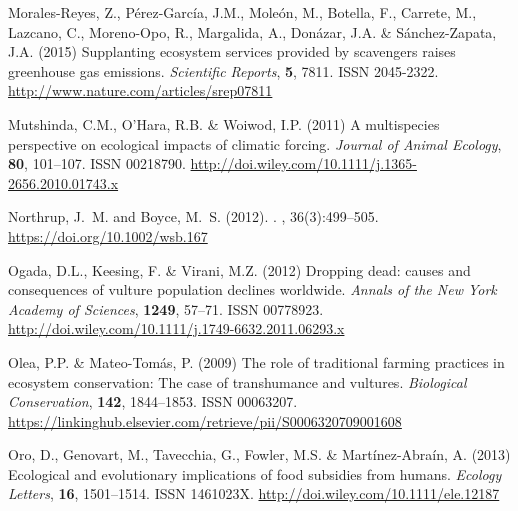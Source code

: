 \documentclass[12pt]{article}
\begin{document}
\begin{thebibliography}{87}
	Morales-Reyes, Z., P{\'{e}}rez-Garc{\'{i}}a, J.M., Mole{\'{o}}n, M., Botella,
	F., Carrete, M., Lazcano, C., Moreno-Opo, R., Margalida, A., Don{\'{a}}zar,
	J.A. \& S{\'{a}}nchez-Zapata, J.A. (2015) {Supplanting ecosystem services
		provided by scavengers raises greenhouse gas emissions}.
	\newblock \emph{Scientific Reports}, \textbf{5}, 7811.
	\newblock ISSN 2045-2322.
	\newline\urlprefix\url{http://www.nature.com/articles/srep07811}
	
	Mutshinda, C.M., O'Hara, R.B. \& Woiwod, I.P. (2011) {A multispecies
		perspective on ecological impacts of climatic forcing}.
	\newblock \emph{Journal of Animal Ecology}, \textbf{80}, 101--107.
	\newblock ISSN 00218790.
	\newline\urlprefix\url{http://doi.wiley.com/10.1111/j.1365-2656.2010.01743.x}
	
	Northrup, J.~M. and Boyce, M.~S. (2012).
	.
	, 36(3):499--505.
	\newline\urlprefix\url{https://doi.org/10.1002/wsb.167}
	
	Ogada, D.L., Keesing, F. \& Virani, M.Z. (2012) {Dropping dead: causes and
		consequences of vulture population declines worldwide}.
	\newblock \emph{Annals of the New York Academy of Sciences}, \textbf{1249},
	57--71.
	\newblock ISSN 00778923.
	\newline\urlprefix\url{http://doi.wiley.com/10.1111/j.1749-6632.2011.06293.x}
	
	Olea, P.P. \& Mateo-Tom{\'{a}}s, P. (2009) {The role of traditional farming
		practices in ecosystem conservation: The case of transhumance and vultures}.
	\newblock \emph{Biological Conservation}, \textbf{142}, 1844--1853.
	\newblock ISSN 00063207.
	\newline\urlprefix\url{https://linkinghub.elsevier.com/retrieve/pii/S0006320709001608}
	
	Oro, D., Genovart, M., Tavecchia, G., Fowler, M.S. \&
	Mart{\'{i}}nez-Abra{\'{i}}n, A. (2013) {Ecological and evolutionary
		implications of food subsidies from humans}.
	\newblock \emph{Ecology Letters}, \textbf{16}, 1501--1514.
	\newblock ISSN 1461023X.
	\newline\urlprefix\url{http://doi.wiley.com/10.1111/ele.12187}
	

\end{thebibliography}
\end{document}

